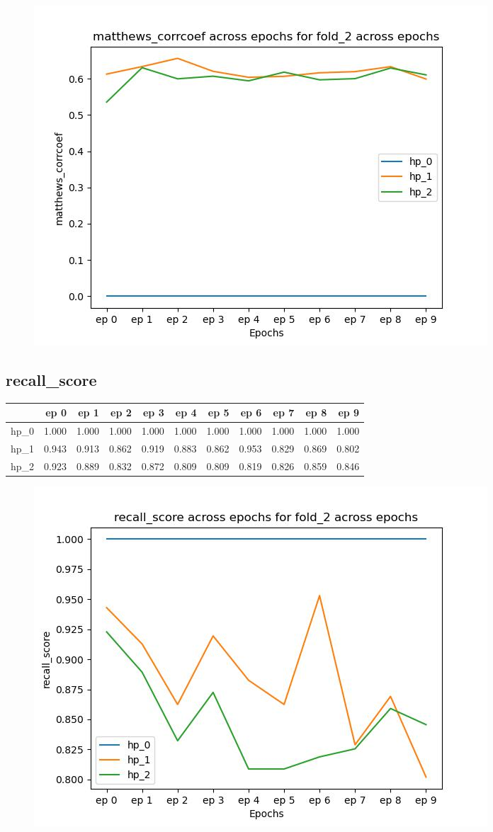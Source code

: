 \documentclass{article}
\begin{document}
\begin{figure}[H]
\includegraphics[scale = 0.75]{fold_2/matthews_corrcoef}
\end{figure}
\subsection{recall\_score}
\begin{tabular}{lrrrrrrrrrr}
\toprule
{} &   ep 0 &   ep 1 &   ep 2 &   ep 3 &   ep 4 &   ep 5 &   ep 6 &   ep 7 &   ep 8 &   ep 9 \\
\midrule
hp\_0 &  1.000 &  1.000 &  1.000 &  1.000 &  1.000 &  1.000 &  1.000 &  1.000 &  1.000 &  1.000 \\
hp\_1 &  0.943 &  0.913 &  0.862 &  0.919 &  0.883 &  0.862 &  0.953 &  0.829 &  0.869 &  0.802 \\
hp\_2 &  0.923 &  0.889 &  0.832 &  0.872 &  0.809 &  0.809 &  0.819 &  0.826 &  0.859 &  0.846 \\
\bottomrule
\end{tabular}

\begin{figure}[H]
\includegraphics[scale = 0.75]{fold_2/recall_score}
\end{figure}
\end{document}
